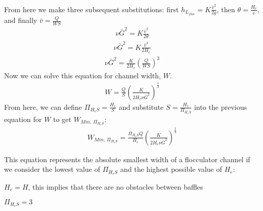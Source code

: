 \documentclass[letterpaper,10pt,english]{sphinxmanual}
\begin{document}
From here we make three subsequent substitutions: first
\(h_{L_{floc}} = K \frac{\bar v^2}{2g}\), then
\(\theta = \frac{H_e}{\bar v}\), and finally
\(\bar v = \frac{Q}{WS}\)
\begin{equation}\label{equation:Flocculation/Floc_Derivations:Flocculation/Floc_Derivations:1}
\begin{split}\nu \bar G^2 = K \frac{\bar v^2}{2 \theta}\end{split}
\end{equation}\begin{equation}\label{equation:Flocculation/Floc_Derivations:Flocculation/Floc_Derivations:2}
\begin{split}\nu \bar G^2 = K \frac{\bar v^3}{2 H_e}\end{split}
\end{equation}\begin{equation}\label{equation:Flocculation/Floc_Derivations:Flocculation/Floc_Derivations:3}
\begin{split}\nu \bar G^2 = \frac{K}{2 H_e} \left( \frac{Q}{WS} \right)^3\end{split}
\end{equation}
Now we can solve this equation for channel width, \(W\).
\begin{equation}\label{equation:Flocculation/Floc_Derivations:Flocculation/Floc_Derivations:4}
\begin{split}W = \frac{Q}{S}\left( \frac{K}{2 H_e \nu \bar G^2} \right)^\frac{1}{3}\end{split}
\end{equation}
From here, we can define \(\Pi_{H_eS} = \frac{H_e}{S}\) and
substitute \(S = \frac{H_e}{\Pi_{H_eS}}\) into the previous equation
for \(W\) to get \(W_{Min, \, \Pi_{H_eS}}\):
\begin{equation}\label{equation:Flocculation/Floc_Derivations:Flocculation/Floc_Derivations:5}
\begin{split}W_{Min, \, \Pi_{H_eS}} = \frac{\Pi_{H_eS}Q}{H_e}\left( \frac{K}{2 H_e \nu \bar G^2} \right)^\frac{1}{3}\end{split}
\end{equation}
\begin{DUlineblock}{0em}
\item[] This equation represents the absolute smallest width of a flocculator
channel if we consider the lowest value of \(\Pi_{H_eS}\) and the
highest possible value of \(H_e\):
\item[] \(H_e = H\), this implies that there are no obstacles between
baffles
\item[] \(\Pi_{H_eS} = 3\)
\end{DUlineblock}
\end{document}
